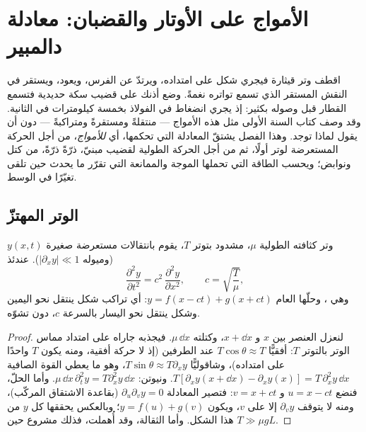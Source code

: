 \chapter{الأمواج على الأوتار والقضبان: معادلة دالمبير}\label{ch:b2:waves-on-strings}

اقطف وتر قيثارة فيجري شكل على امتداده، ويرتدّ عن الفرس،
ويعود، ويستقر في النقش المستقر الذي تسمع تواتره نغمةً. وضع
أذنك على قضيب سكة حديدية فتسمع القطار قبل وصوله بكثير: إذ
يجري انضغاط في الفولاذ بخمسة كيلومترات في الثانية. وقد وصف
كتاب السنة الأولى مثل هذه الأمواج --- منتقلةً ومستقرةً
ومتراكبةً --- دون أن يقول لماذا توجد. وهذا الفصل يشتقّ
المعادلة التي تحكمها، أي \emph{ للأمواج}، من أجل
الحركة المستعرضة لوتر أولًا، ثم من أجل الحركة الطولية لقضيب
مبنيّ، ذرّةً ذرّةً، من كتل ونوابض؛ ويحسب الطاقة التي تحملها
الموجة والممانعة التي تقرّر ما يحدث حين تلقى تغيّرًا في الوسط.

\section{الوتر المهتزّ}

\begin{theorem}\label{thm:b2:waves-on-strings:equation}
وتر كثافته الطولية $\mu$، مشدود بتوتر $T$، يقوم بانتقالات
مستعرضة صغيرة $y(x, t)$ (وميوله $|\partial_xy| \ll 1$). عندئذ
\[
\frac{\partial^2y}{\partial t^2} = c^2\,\frac{\partial^2y}{\partial x^2} ,
\qquad c = \sqrt{\frac{T}{\mu}} ,
\]
وهي \emph{}، وحلّها العام $y = f(x - ct)
+ g(x + ct)$: أي تراكب شكل ينتقل نحو اليمين وشكل ينتقل نحو
اليسار بالسرعة $c$، دون تشوّه.
\end{theorem}

\begin{proof}
لنعزل العنصر بين $x$ و $x + \dd x$، وكتلته $\mu\,\dd x$. فيجذبه
جاراه على امتداد مماس الوتر بالتوتر $T$:
أفقيًّا $T\cos\theta \approx T$ عند الطرفين (إذ لا حركة أفقية، ومنه
يكون $T$ واحدًا على امتداده)، وشاقوليًّا $T\sin\theta \approx T\partial_xy$، وهو ما
يعطي القوة الصافية $T[\partial_xy(x + \dd x) - \partial_xy(x)] = T\,\partial_x^2y\,\dd x$.
ونيوتن: $\mu\,\dd x\,\partial_t^2y = T\partial_x^2y\,\dd x$. وأما الحلّ، فنضع
$u = x - ct$ و $v = x + ct$: فتصير المعادلة $\partial_u\partial_vy = 0$
(بقاعدة الاشتقاق المركّب)، ومنه لا يتوقف $\partial_vy$ إلا على $v$، ويكون $y = f(u) + g(v)$؛
وبالعكس يحققها كل $y$ من هذا الشكل. وأما الثقالة، وقد أُهملت، فذلك مشروع
حين $T \gg \mu gL$.
\end{proof}

